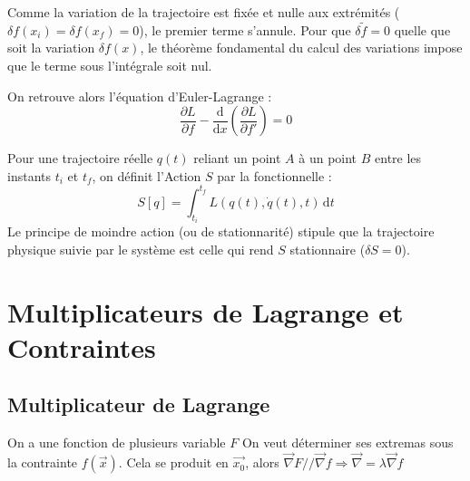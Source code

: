 \documentclass[french]{yLectureNote}
\renewcommand{\vec}{\overrightarrow}
\newcommand{\dd}{\mathrm{d}}
\begin{document}
Comme la variation de la trajectoire est fixée et nulle aux extrémités ($\delta f(x_i) = \delta f(x_f) = 0$), le premier terme s'annule. Pour que $\delta \tilde{f} = 0$ quelle que soit la variation $\delta f(x)$, le théorème fondamental du calcul des variations impose que le terme sous l'intégrale soit nul. 

On retrouve alors l'équation d'Euler-Lagrange :
$$ \frac{\partial L}{\partial f} - \frac{\dd}{\dd x} \left( \frac{\partial L}{\partial f'} \right) = 0 $$

\begin{definition}[Action]
Pour une trajectoire réelle $q(t)$ reliant un point $A$ à un point $B$ entre les instants $t_i$ et $t_f$, on définit l'Action $S$ par la fonctionnelle :
$$ S[q] = \int_{t_i}^{t_f} L(q(t), \dot{q}(t), t) \, \dd t $$
Le principe de moindre action (ou de stationnarité) stipule que la trajectoire physique suivie par le système est celle qui rend $S$ stationnaire ($\delta S = 0$).
\end{definition}

\section{Multiplicateurs de Lagrange et Contraintes}
\subsection{Multiplicateur de Lagrange}
On a une fonction de plusieurs variable $F$ On veut déterminer ses extremas sous la contrainte $f(\vec{x})$. Cela se produit en $\vec{x_0}$, alors 
$\vec{\nabla}F // \vec{\nabla}f \Rightarrow \vec{\nabla} = \lambda \vec{\nabla} f$
\end{document}
